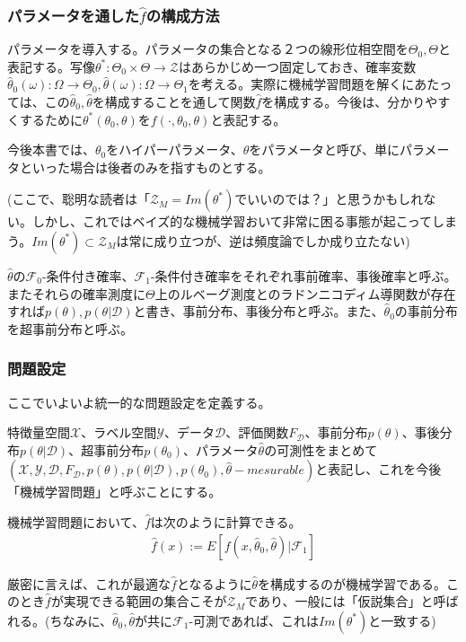 \documentclass[dvipdfmx, a4paper]{jsarticle}
\begin{document}
\subsubsection{パラメータを通した$\hat{f}$の構成方法}
パラメータを導入する。パラメータの集合となる２つの線形位相空間を$\Theta_0,\Theta$と表記する。写像$\theta^*:\Theta_0\times\Theta\to\mathcal{Z}$はあらかじめ一つ固定しておき、確率変数$\hat{\theta}_0(\omega)\colon\Omega\to\Theta_0,\hat{\theta}(\omega)\colon\Omega\to\Theta_1$を考える。実際に機械学習問題を解くにあたっては、この$\hat{\theta}_0,\hat{\theta}$を構成することを通して関数$\hat{f}$を構成する。今後は、分かりやすくするために$\theta^*(\theta_0,\theta)$を$f(\cdot,\theta_0,\theta)$と表記する。

今後本書では、$\theta_0$をハイパーパラメータ、$\theta$をパラメータと呼び、単にパラメータといった場合は後者のみを指すものとする。

(ここで、聡明な読者は「$\mathcal{Z}_M=Im(\theta^*)$でいいのでは？」と思うかもしれない。しかし、これではベイズ的な機械学習おいて非常に困る事態が起こってしまう。$Im(\theta^*)\subset\mathcal{Z}_M$は常に成り立つが、逆は頻度論でしか成り立たない)

$\hat{\theta}$の$\mathcal{F}_0$-条件付き確率、$\mathcal{F}_1$-条件付き確率をそれぞれ事前確率、事後確率と呼ぶ。またそれらの確率測度に$\Theta$上のルベーグ測度とのラドンニコディム導関数が存在すれば$p(\theta),p(\theta|\mathcal{D})$と書き、事前分布、事後分布と呼ぶ。また、$\hat{\theta}_0$の事前分布を超事前分布と呼ぶ。

\subsubsection{問題設定}
ここでいよいよ統一的な問題設定を定義する。

特徴量空間$\mathcal{X}$、ラベル空間$\mathcal{Y}$、データ$\mathcal{D}$、評価関数$F_\mathcal{D}$、事前分布$p(\theta)$、事後分布$p(\theta|\mathcal{D})$、超事前分布$p(\theta_0)
$、パラメータ$\hat{\theta}$の可測性をまとめて$(\mathcal{X},\mathcal{Y},\mathcal{D},F_\mathcal{D},p(\theta),p(\theta|\mathcal{D}),p(\theta_0),\hat{\theta}-mesurable)$と表記し、これを今後「機械学習問題」と呼ぶことにする。



機械学習問題において、$\hat{f}$は次のように計算できる。
\begin{align}
\hat{f}(x):=E[f(x,\hat{\theta}_0,\hat{\theta})|\mathcal{F}_1]
\end{align}

厳密に言えば、これが最適な$\hat{f}$となるように$\hat{\theta}$を構成するのが機械学習である。このとき$\hat{f}$が実現できる範囲の集合こそが$\mathcal{Z}_M$であり、一般には「仮説集合」と呼ばれる。(ちなみに、$\hat{\theta}_0,\hat{\theta}$が共に$\mathcal{F}_1$-可測であれば、これは$Im(\theta^*)$と一致する)
\end{document}
